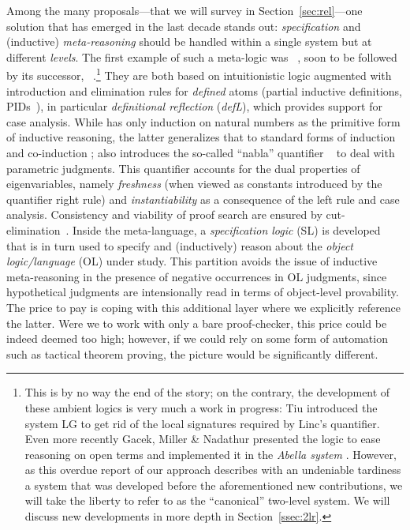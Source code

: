 \documentclass[final]{svjour3}
\begin{document}
Among the many proposals---that we will survey in
Section~\ref{sec:rel}---one solution that has emerged in the last
decade stands out: \emph{specification} and (inductive)
\emph{meta-reasoning} should be handled within a single system but at different \emph{levels}. The first
example of such a meta-logic was ~\cite{McDowell01}, soon to
be followed by its successor, ~\cite{Tiu04phd}.\footnote{This
  is by no way the end of the story; on the contrary, the development
  of these ambient logics is very much a work in progress: Tiu
  \cite{Tiu07} introduced the system LG to get rid of the
  local signatures required by Linc's  quantifier. Even more recently Gacek,
  Miller \& Nadathur presented the logic  to ease reasoning
  on open terms and implemented it in the \emph{Abella system}
  \cite{gacek08lics,Abella,AbellaSOS}. However, as this overdue report
  of our approach describes with an undeniable tardiness a system that
  was developed before the aforementioned new contributions,
  we will take the liberty to refer to  as the ``canonical''
  two-level system. We will discuss new developments in more depth in
  Section~\ref{ssec:2lr}.}  They are both based on intuitionistic logic augmented with introduction and elimination rules
for \emph{defined} atoms (partial inductive definitions,
PIDs~\cite{Halnass91}), in particular \emph{definitional reflection}
(\emph{defL}), which provides support for case analysis. While
 has only induction on natural numbers as the primitive form
of inductive reasoning, the latter generalizes that to standard forms
of induction and co-induction \cite{MomiglianoT03};  also
introduces the so-called ``nabla'' quantifier
~\cite{miller05tocl} to deal with parametric judgments.  This
quantifier accounts for the dual properties of eigenvariables, namely
\emph{freshness} (when viewed as constants introduced by the
quantifier right rule) and \emph{instantiability} as a consequence of
the left rule and case analysis. Consistency and viability of proof search are ensured by
cut-elimination~\cite{mcdowell00tcs,Tiu04phd}. Inside the
meta-language, a \emph{specification logic} (SL) is developed that is
in turn used to specify and (inductively) reason about the
\emph{object logic/language} (OL) under study.
This partition avoids the issue of inductive meta-reasoning in
the presence of negative occurrences in OL judgments, since
hypothetical judgments are intensionally read in terms of object-level
provability. The price to pay is coping with this additional layer where we
explicitly reference the latter.  Were we to work with only a bare
proof-checker, this price could be indeed deemed too high; however, if
we could rely on some form of automation such as tactical theorem
proving, the picture would be significantly different.
\end{document}
